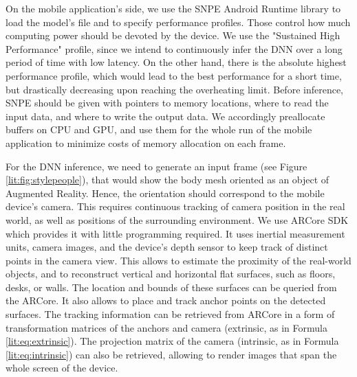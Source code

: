 On the mobile application's side, we use the SNPE Android Runtime library to load the model's file and to specify performance profiles. Those control how much computing power should be devoted by the device. We use the "Sustained High Performance" profile, since we intend to continuously infer the DNN over a long period of time with low latency. On the other hand, there is the absolute highest performance profile, which would lead to the best performance for a short time, but drastically decreasing upon reaching the overheating limit. Before inference, SNPE should be given with pointers to memory locations, where to read the input data, and where to write the output data. We accordingly preallocate buffers on CPU and GPU, and use them for the whole run of the mobile application to minimize costs of memory allocation on each frame.

For the DNN inference, we need to generate an input frame (see Figure \ref{lit:fig:stylepeople}), that would show the body mesh oriented as an object of Augmented Reality. Hence, the orientation should correspond to the mobile device's camera. This requires continuous tracking of camera position in the real world, as well as positions of the surrounding environment. We use ARCore SDK \cite{aux:arcore22} which provides it with little programming required. It uses inertial measurement units, camera images, and the device's depth sensor to keep track of distinct points in the camera view. This allows to estimate the proximity of the real-world objects, and to reconstruct vertical and horizontal flat surfaces, such as floors, desks, or walls. The location and bounds of these surfaces can be queried from the ARCore. It also allows to place and track anchor points on the detected surfaces. The tracking information can be retrieved from ARCore in a form of transformation matrices of the anchors and camera (extrinsic, as in Formula \ref{lit:eq:extrinsic}). The projection matrix of the camera (intrinsic, as in Formula \ref{lit:eq:intrinsic}) can also be retrieved, allowing to render images that span the whole screen of the device. 

